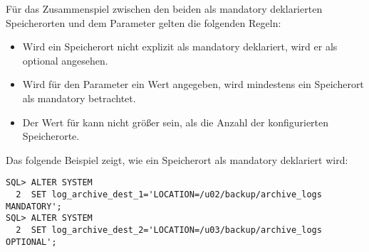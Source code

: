           Für das Zusammenspiel zwischen den beiden als mandatory deklarierten Speicherorten und dem Parameter  gelten die folgenden Regeln:
          \begin{itemize}
            \item Wird ein Speicherort nicht explizit als mandatory deklariert, wird er als optional angesehen.
            \item Wird für den Parameter  ein Wert angegeben, wird mindestens ein Speicherort als mandatory betrachtet.
            \item Der Wert für  kann nicht größer sein, als die Anzahl der konfigurierten Speicherorte.
          \end{itemize}
          Das folgende Beispiel zeigt, wie ein Speicherort als mandatory deklariert wird:
          \begin{lstlisting}[caption={\parameter{log\_archive\_dest\_n} als mandatory deklarieren},label=admin51,language=oracle_sql]
SQL> ALTER SYSTEM
  2  SET log_archive_dest_1='LOCATION=/u02/backup/archive_logs MANDATORY';
SQL> ALTER SYSTEM
  2  SET log_archive_dest_2='LOCATION=/u03/backup/archive_logs OPTIONAL';
          \end{lstlisting}
